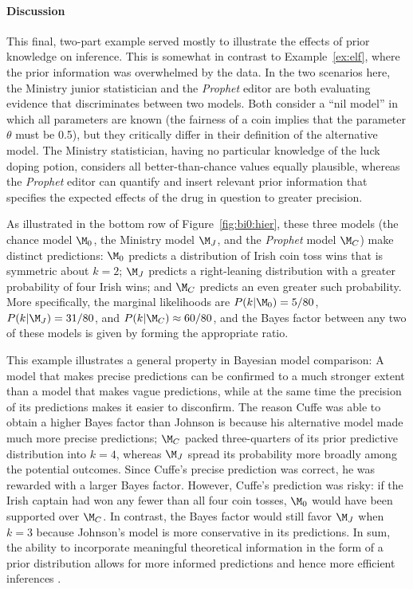 \paragraph{Discussion} This final, two-part example served mostly to illustrate the effects of prior knowledge on inference. {This is somewhat in contrast to Example~\ref{ex:elf}, where the prior information was overwhelmed by the data.} In the two scenarios {here,} the Ministry junior statistician and the \textit{Prophet} editor are both evaluating evidence that discriminates between two models. Both consider a ``nil model'' in which all parameters are known (the fairness of a coin implies that the parameter $\theta$ must be 0.5), but they critically differ in their definition of the alternative model. The Ministry statistician, having no particular knowledge of the luck doping potion, considers all better-than-chance values equally plausible, whereas the \textit{Prophet} editor can quantify and insert relevant prior information that specifies the expected effects of the drug in question to greater precision. 

As illustrated in the bottom row of Figure~\ref{fig:bi0:hier}, these three models (the chance model $\M_0$, the Ministry model $\M_J$, and the \textit{Prophet} model $\M_C$) make distinct predictions: $\M_0$ predicts a distribution of Irish coin toss wins that is symmetric about $k=2$; $\M_J$ predicts a right-leaning distribution with a greater probability of four Irish wins; and $\M_C$ predicts an even greater such probability. More specifically, the marginal likelihoods are $P(k|\M_0) =  5/80$, $P(k|\M_J) = 31/80$, and $P(k|\M_C) \approx 60/80$, and the Bayes factor between any two of these models is given by forming the appropriate ratio.

This example illustrates a general property in Bayesian model comparison: A model that makes precise predictions can be confirmed to a much stronger extent than a model that makes vague predictions, while at the same time the precision of its predictions makes it easier to disconfirm. 
The reason Cuffe was able to obtain a higher Bayes factor than Johnson is because his alternative model made much more precise predictions; $\M_C$ packed three-quarters of its prior predictive distribution into $k=4$, whereas $\M_J$ spread its probability more broadly among the potential outcomes. Since Cuffe's precise prediction was correct, he was rewarded with a larger Bayes factor. However, Cuffe's prediction was risky: if the Irish captain had won any fewer than all four coin tosses, $\M_0$ would have been supported over $\M_C$. In contrast, the Bayes factor would still favor $\M_J$ when $k=3$ because Johnson's model is more conservative in its predictions. In sum, the ability to incorporate meaningful theoretical information in the form of a prior distribution allows for more informed predictions and hence more efficient inferences \cite{LeeSI}. 


